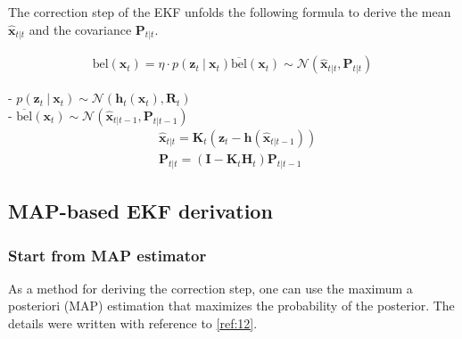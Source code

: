 \documentclass[10pt]{article}
\begin{document}
The correction step of the EKF unfolds the following formula to derive the mean $\hat{\mathbf{x}}_{t|t}$ and the covariance $\mathbf{P}_{t|t}$.

\begin{equation}
	\begin{aligned} 
		\text{bel}( \mathbf{x}_{t}) = \eta \cdot p(\mathbf{z}_{t} \ | \ \mathbf{x}_{t}) \overline{\text{bel}}( \mathbf{x}_{t}) \sim \mathcal{N}(\hat{\mathbf{x}}_{t|t}, \mathbf{P}_{t|t})
	\end{aligned} 
\end{equation}

- $p(\mathbf{z}_{t} \ | \ \mathbf{x}_{t}) \sim \mathcal{N}( \mathbf{h}_{t}(\mathbf{x}_{t}) , \mathbf{R}_{t})$ \\
- $\overline{\text{bel}}( \mathbf{x}_{t}) \sim \mathcal{N}( \hat{\mathbf{x}}_{t|t-1}, \mathbf{P}_{t|t-1})$\\

\begin{equation} 
	\boxed{  \begin{aligned} 
			& \hat{\mathbf{x}}_{t|t} = \mathbf{K}_{t} ( \mathbf{z}_{t} - \mathbf{h}(\hat{\mathbf{x}}_{t|t-1})) \\
			& \mathbf{P}_{t|t} = (\mathbf{I} - \mathbf{K}_{t}\mathbf{H}_{t})\mathbf{P}_{t|t-1}
	\end{aligned} }
\end{equation}

\subsection{MAP-based EKF derivation}

\subsubsection{Start from MAP estimator}

As a method for deriving the correction step, one can use the maximum a posteriori (MAP) estimation that maximizes the probability of the posterior. The details were written with reference to \ref{ref:12}.
\end{document}
